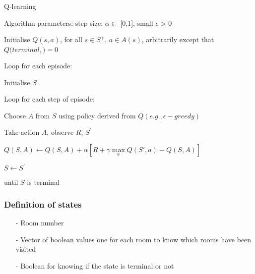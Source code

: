 \documentclass[../Head/Main.tex]{subfiles}
\begin{document}
\begin{Pseudo}{Q-learning}{}
\begin{Indentation}
    \item Algorithm parameters: step size: $\alpha\in$ [0,1], small  $\epsilon$ > 0 \vspace{-2pt}
    \item Initialise $Q(s,a)$, for all $s\in S^{+}$, $a\in A(s)$, arbitrarily except that $Q(terminal,\dot)=0$
    \item Loop for each episode: \vspace{-2pt}
    \begin{Indentation}
        \item Initialise $S$ \vspace{-2pt}
        \item Loop for each step of episode: \vspace{-2pt}
        \begin{Indentation}
            \item Choose $A$ from $S$ using policy derived from $Q(e.g., \epsilon-greedy)$ \vspace{-2pt}
            \item Take action $A$, observe $R$, $S^{'}$ \vspace{-1pt}
            \item $Q(S,A) \leftarrow Q(S,A) + \alpha \left[R + \gamma \max\limits_{a} Q(S',a) - Q(S,A)\right]$
            \item $S\leftarrow S^{'}$ \vspace{-2pt}
        \end{Indentation}
        \item until $S$ is terminal 
    \end{Indentation}
\end{Indentation}
\end{Pseudo}
\subsubsection{Definition of states}

\begin{itemize}
	\item[-] Room number
	\item[-] Vector of boolean values one for each room to know which rooms have been visited
	\item[-] Boolean for knowing if the state is terminal or not 
\end{itemize}
\end{document}
